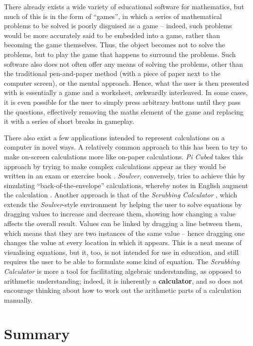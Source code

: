 \documentclass[12pt,twoside,notitlepage,xetex]{report}
\begin{document}
There already exists a wide variety of educational software for mathematics, but
much of this is in the form of ``games'', in which a series of mathematical
problems to be solved is poorly disguised as a game -- indeed, such problems
would be more accurately said to be embedded into a game, rather than becoming
the game themselves.  Thus, the object becomes not to solve the problems, but to
play the game that happens to surround the problems.  Such software also does
not often offer any means of solving the problems, other than the traditional
pen-and-paper method (with a piece of paper next to the computer screen), or
the mental approach.  Hence, what the user is then presented with is essentially
a game and a worksheet, awkwardly interleaved.  In some cases, it is even
possible for the user to simply press arbitrary buttons until they pass the
questions, effectively removing the maths element of the game and replacing it
with a series of short breaks in gameplay. %

There also exist a few applications intended to represent calculations on a
computer in novel ways.  A relatively common approach to this has been to try
to make on-screen calculations more like on-paper calculations.  \emph{Pi Cubed}
takes this approach by trying to make complex calculations appear as they would
be written in an exam or exercise book \cite{PiCubed}.  \emph{Soulver},
conversely, tries to achieve this by simulating ``back-of-the-envelope''
calculations, whereby notes in English augment the calculation \cite{Soulver}.
Another approach is that of the \emph{Scrubbing Calculator} \cite{ScrubCalc},
which extends the \emph{Soulver}-style environment by helping the user to solve
equations by dragging values to increase and decrease them, showing how changing
a value affects the overall result.  Values can be linked by dragging a line
between them, which means that they are two instances of the same value -- hence
dragging one changes the value at every location in which it appears.  This is a
neat means of visualising equations, but it, too, is not intended for use in
education, and still requires the user to be able to formulate some kind of
equation.  The \emph{Scrubbing Calculator} is more a tool for facilitating
algebraic understanding, as opposed to arithmetic understanding; indeed, it is
inherently a {\bf calculator}, and so does not encourage thinking about how to
work out the arithmetic parts of a calculation manually.

\section{Summary}
\end{document}
